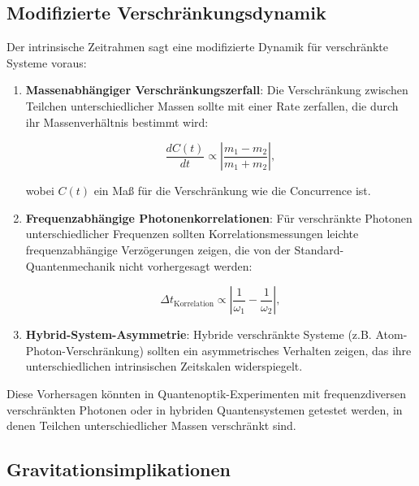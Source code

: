 \documentclass[12pt,a4paper]{article}
\begin{document}
	\subsection{Modifizierte Verschränkungsdynamik}
	\label{subsec:entanglement_dynamics}
	
	Der intrinsische Zeitrahmen sagt eine modifizierte Dynamik für verschränkte Systeme voraus:
	
	\begin{enumerate}
		\item \textbf{Massenabhängiger Verschränkungszerfall}: Die Verschränkung zwischen Teilchen unterschiedlicher Massen sollte mit einer Rate zerfallen, die durch ihr Massenverhältnis bestimmt wird:
		
		\begin{equation}
			\frac{dC(t)}{dt} \propto \left|\frac{m_1 - m_2}{m_1 + m_2}\right|,
			\label{eq:entanglement_decay}
		\end{equation}
		
		wobei $C(t)$ ein Maß für die Verschränkung wie die Concurrence ist.
		
		\item \textbf{Frequenzabhängige Photonenkorrelationen}: Für verschränkte Photonen unterschiedlicher Frequenzen sollten Korrelationsmessungen leichte frequenzabhängige Verzögerungen zeigen, die von der Standard-Quantenmechanik nicht vorhergesagt werden:
		
		\begin{equation}
			\Delta t_{\text{Korrelation}} \propto \left|\frac{1}{\omega_1} - \frac{1}{\omega_2}\right|,
			\label{eq:frequency_delay}
		\end{equation}
		
		\item \textbf{Hybrid-System-Asymmetrie}: Hybride verschränkte Systeme (z.B. Atom-Photon-Verschränkung) sollten ein asymmetrisches Verhalten zeigen, das ihre unterschiedlichen intrinsischen Zeitskalen widerspiegelt.
	\end{enumerate}
	
	Diese Vorhersagen könnten in Quantenoptik-Experimenten mit frequenzdiversen verschränkten Photonen oder in hybriden Quantensystemen getestet werden, in denen Teilchen unterschiedlicher Massen verschränkt sind.
	
	\subsection{Gravitationsimplikationen}
	\label{subsec:gravitational_implications}
	
\end{document}
